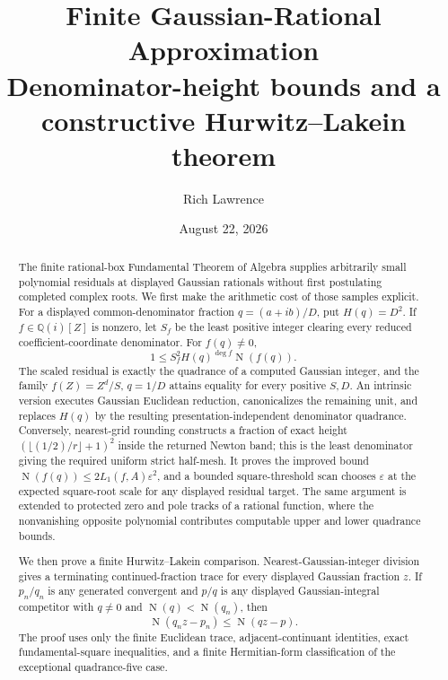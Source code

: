 \documentclass[11pt]{article}
\title{Finite Gaussian-Rational Approximation\\
\large Denominator-height bounds and a constructive Hurwitz--Lakein theorem}
\author{Rich Lawrence}
\date{August 22, 2026}
\newcommand{\Qi}{\mathbb{Q}(i)}
\newcommand{\Norm}[1]{\operatorname{N}\!\left(#1\right)}
\newcommand{\eps}{\varepsilon}
\begin{document}
\maketitle

\begin{abstract}
The finite rational-box Fundamental Theorem of Algebra supplies arbitrarily
small polynomial residuals at displayed Gaussian rationals without first
postulating completed complex roots.  We first make the arithmetic cost of
those samples explicit.  For a displayed common-denominator fraction
$q=(a+ib)/D$, put $H(q)=D^2$.  If $f\in\Qi[Z]$ is nonzero, let $S_f$ be the
least positive integer clearing every reduced coefficient-coordinate
denominator.  For $f(q)\ne0$,
\[
                 1\le S_f^2H(q)^{\deg f}\Norm{f(q)}.
\]
The scaled residual is exactly the quadrance of a computed Gaussian integer,
and the family $f(Z)=Z^d/S$, $q=1/D$ attains equality for every positive
$S,D$.
An intrinsic version executes Gaussian Euclidean reduction, canonicalizes
the remaining unit, and replaces $H(q)$ by the resulting
presentation-independent denominator quadrance.  Conversely, nearest-grid
rounding constructs a fraction of
exact height $(\lfloor(1/2)/r\rfloor+1)^2$ inside the returned Newton band;
this is the least denominator giving the required uniform strict half-mesh.
It proves the improved bound
$\Norm{f(q)}\le2L_1(f,A)\eps^2$, and a bounded square-threshold scan chooses
$\eps$ at the expected square-root scale for any displayed residual target.
The same argument is extended to protected zero and pole tracks of a rational
function, where the nonvanishing opposite polynomial contributes computable
upper and lower quadrance bounds.

We then prove a finite Hurwitz--Lakein comparison.  Nearest-Gaussian-integer
division gives a terminating continued-fraction trace for every displayed
Gaussian fraction $z$.  If $p_n/q_n$ is any generated convergent and
$p/q$ is any displayed Gaussian-integral competitor with $q\ne0$ and
$\Norm q<\Norm{q_n}$, then
\[
              \Norm{q_nz-p_n}\le\Norm{qz-p}.
\]
The proof uses only the finite Euclidean trace, adjacent-continuant
identities, exact fundamental-square inequalities, and a finite Hermitian-form
classification of the exceptional quadrance-five case.


\end{abstract}
\end{document}
